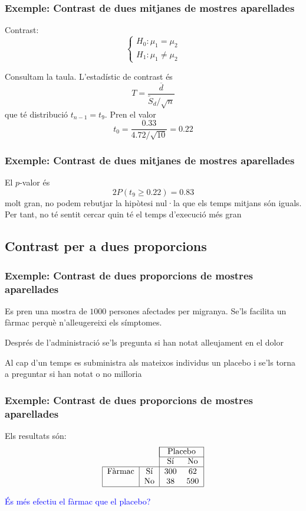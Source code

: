\documentclass[12pt,t]{beamer}\usepackage[]{graphicx}\usepackage[]{color}
\newcommand{\blue}[1]{\textcolor{blue}{#1}}
\renewcommand{\emph}[1]{{\color{red}#1}}
\renewcommand{\geq}{\geqslant}
\theoremstyle{plain}
\theoremstyle{definition}
\begin{document}
\begin{frame}
\frametitle{Exemple: Contrast de dues mitjanes de mostres aparellades}
\emph{Contrast}:
$$
\left\{\begin{array}{l}
H_0:\mu_1=\mu_2\\
H_1:\mu_1\neq \mu_2
\end{array}\right.
$$


Consultam la taula. L'estadístic de contrast és
$$
T=\frac{\overline{d}}{\widetilde{S}_d/\sqrt{n}}
$$
que té distribució $t_{n-1}=t_9$. Pren el valor
$$
t_0=\frac{0.33}{4.72/\sqrt{10}}=0.22
$$


\end{frame}

\begin{frame}
\frametitle{Exemple: Contrast de dues mitjanes de mostres aparellades}


El $p$-valor és
$$
2P(t_9\geq 0.22)=0.83
$$
molt gran, no podem rebutjar la hipòtesi nul·la que els temps mitjans són iguals. Per tant, no té sentit cercar quin té el temps d'execució més gran
\end{frame}




\subsection{Contrast per a dues proporcions}
\begin{frame}
\frametitle{Exemple: Contrast de dues proporcions de mostres aparellades}

Es pren una mostra de $1000$ persones afectades per migranya. Se'ls
facilita un fàrmac perquè n'alleugereixi els símptomes.
\medskip

Després de l'administració se'ls pregunta si han notat alleujament en
el dolor
\medskip

Al cap d'un temps es subministra als mateixos individus un placebo
i se'ls torna a preguntar si han notat o no milloria
\end{frame}

\begin{frame}
\frametitle{Exemple: Contrast de dues proporcions de mostres aparellades}

Els resultats són:
$$
\begin{tabular}{|c|c|cc|}
\cline{3-4}
\multicolumn{2}{c|}{}& \multicolumn{2}{|c|} {Placebo}\\\cline{3-4}
\multicolumn{2}{c|}{} & Sí & No \\\hline
Fàrmac & Sí & 300 & 62 \\
& No & 38 & 590
\\\hline
\end{tabular}
$$

\blue{És més efectiu el fàrmac que el placebo?}
\end{frame}
\end{document}
